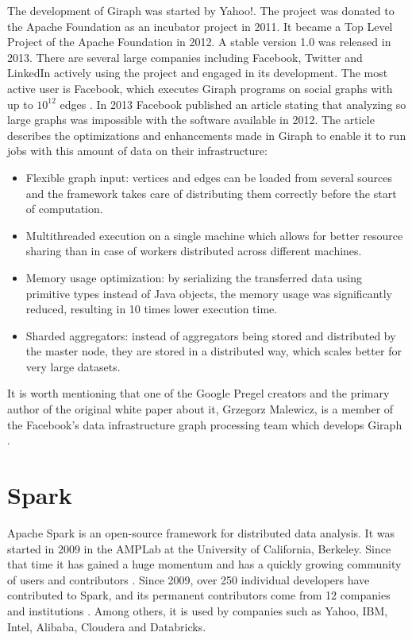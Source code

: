 The development of Giraph was started by Yahoo!. The project was donated to the Apache Foundation as an incubator project in 2011. It became a Top Level Project of the Apache Foundation in 2012. A stable version 1.0 was released in 2013. There are several large companies including Facebook, Twitter and LinkedIn actively using the project and engaged in its development. The most active user is Facebook, which executes Giraph programs on social graphs with up to $10^{12}$ edges \cite{giraphfb}. In 2013 Facebook published an article \cite{giraphfb} stating that analyzing so large graphs was impossible with the software available in 2012. The article describes the optimizations and enhancements made in Giraph to enable it to run jobs with this amount of data on their infrastructure:
\begin{itemize}
\item Flexible graph input: vertices and edges can be loaded from several sources and the framework takes care of distributing them correctly before the start of computation.
\item Multithreaded execution on a single machine which allows for better resource sharing than in case of workers distributed across different machines.
\item Memory usage optimization: by serializing the transferred data using primitive types instead of Java objects, the memory usage was significantly reduced, resulting in 10 times lower execution time.
\item Sharded aggregators: instead of aggregators being stored and distributed by the master node, they are stored in a distributed way, which scales better for very large datasets.
\end{itemize}
It is worth mentioning that one of the Google Pregel creators and the primary author of the original white paper about it, Grzegorz Malewicz, is a member of the Facebook's data infrastructure graph processing team which develops Giraph \cite{giraphfb}.

\section{Spark}\label{s:spark}
Apache Spark \cite{spark, spark2} is an open-source framework for distributed data analysis. It was started in 2009 in the AMPLab at the University of California, Berkeley. Since that time it has gained a huge momentum and has a quickly growing community of users and contributors \cite{sparkgrowingcommunity}. Since 2009, over 250 individual developers have contributed to Spark, and its permanent contributors come from 12 companies and institutions \cite{sparkwww}. Among others, it is used by companies such as Yahoo, IBM, Intel, Alibaba, Cloudera and Databricks.

